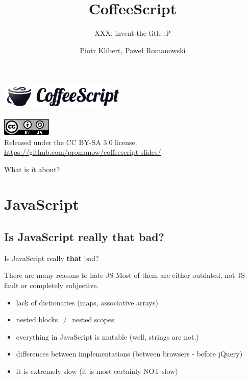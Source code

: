 \documentclass[xcolor=dvipsnames]{beamer}
\title{CoffeeScript}
\subtitle{XXX: invent the title :P}
\author{Piotr Klibert, Paweł Romanowski}
\newcommand{\slide}[1]{\begin{frame}[fragile]{{#1}}}
\begin{document}
\begin{frame}[plain]
    \begin{center}
        \includegraphics[scale=0.25]{img/logo.png}
    \end{center}

    \titlepage

    \begin{center}
        \includegraphics[scale=0.5]{img/cc.png} \\
        Released under the CC BY-SA 3.0 license. \\
        \vspace{0.5cm}
        \url{https://github.com/promanow/coffeescript-slides/}
    \end{center}

\end{frame}

\begin{frame}{What is it about?}
    \tableofcontents
\end{frame}



\section{JavaScript}

\subsection{Is JavaScript really that bad?}
\begin{frame}[fragile]{}
    Is JavaScript really \textbf{that} bad?
\end{frame}

\slide{There are many reasons to hate JS}
    Most of them are either outdated, not JS fault or completely subjective. \\ %
    
    \pause

    \begin{itemize}
        \item lack of dictionaries (maps, associative arrays)
        \item nested blocks $\not=$ nested scopes
        \item everything in JavaScript is mutable (well, strings are not.)
        \item differences between implementations (between browsers - before jQuery)
        \item it is extremely slow (it is most certainly NOT slow)
    \end{itemize}
\end{frame}
\end{document}
